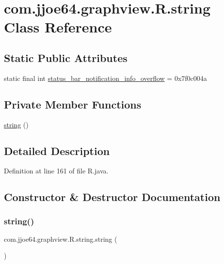 \hypertarget{classcom_1_1jjoe64_1_1graphview_1_1_r_1_1string}{}\section{com.\+jjoe64.\+graphview.\+R.\+string Class Reference}
\label{classcom_1_1jjoe64_1_1graphview_1_1_r_1_1string}
\subsection*{Static Public Attributes}
\begin{DoxyCompactItemize}
\item 
static final int \mbox{\hyperlink{classcom_1_1jjoe64_1_1graphview_1_1_r_1_1string_a7d583396aeb69569c8304e0e68da8c43}{status\+\_\+bar\+\_\+notification\+\_\+info\+\_\+overflow}} = 0x7f0c004a
\end{DoxyCompactItemize}
\subsection*{Private Member Functions}
\begin{DoxyCompactItemize}
\item 
\mbox{\hyperlink{classcom_1_1jjoe64_1_1graphview_1_1_r_1_1string_a8f78ebc11cabc1325aff3aff7733a185}{string}} ()
\end{DoxyCompactItemize}


\subsection{Detailed Description}


Definition at line 161 of file R.\+java.



\subsection{Constructor \& Destructor Documentation}
\mbox{\label{classcom_1_1jjoe64_1_1graphview_1_1_r_1_1string_a8f78ebc11cabc1325aff3aff7733a185}} 
\subsubsection{\texorpdfstring{string()}{string()}}
{\footnotesize\ttfamily com.\+jjoe64.\+graphview.\+R.\+string.\+string (\begin{DoxyParamCaption}{ }\end{DoxyParamCaption})\hspace{0.3cm}{\ttfamily [private]}}



